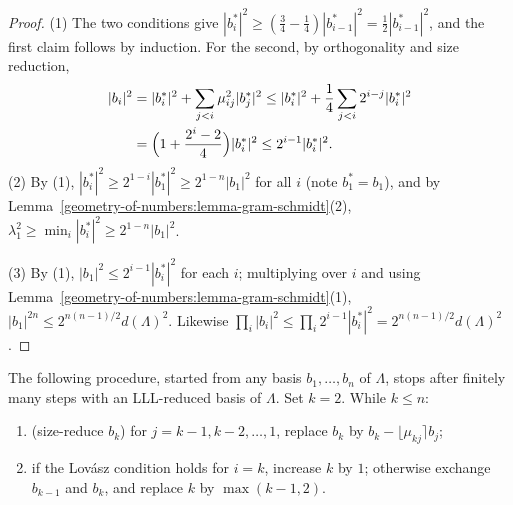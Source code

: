 \begin{proof}
(1) The two conditions give $|b_i^*|^2 \geq (\frac34 - \frac14)|b_{i-1}^*|^2 = \frac12|b_{i-1}^*|^2$, and the first claim follows by induction. For the second, by orthogonality and size reduction,
\[
\begin{aligned}
|b_i|^2 &= |b_i^*|^2 + \sum_{j<i}\mu_{ij}^2|b_j^*|^2 \leq |b_i^*|^2 + \frac14\sum_{j<i}2^{i-j}|b_i^*|^2\\
&= \Bigl(1 + \frac{2^i - 2}{4}\Bigr)|b_i^*|^2 \leq 2^{i-1}|b_i^*|^2.
\end{aligned}
\]
(2) By (1), $|b_i^*|^2 \geq 2^{1-i}|b_1^*|^2 \geq 2^{1-n}|b_1|^2$ for all $i$ (note $b_1^* = b_1$), and by Lemma~\ref{geometry-of-numbers:lemma-gram-schmidt}(2), $\lambda_1^2 \geq \min_i|b_i^*|^2 \geq 2^{1-n}|b_1|^2$.

(3) By (1), $|b_1|^2 \leq 2^{i-1}|b_i^*|^2$ for each $i$; multiplying over $i$ and using Lemma~\ref{geometry-of-numbers:lemma-gram-schmidt}(1), $|b_1|^{2n} \leq 2^{n(n-1)/2}d(\Lambda)^2$. Likewise
$\prod_i|b_i|^2 \leq \prod_i2^{i-1}|b_i^*|^2 = 2^{n(n-1)/2}d(\Lambda)^2$.
\end{proof}

\begin{theorem}\label{geometry-of-numbers:theorem-lll}
The following procedure, started from any basis $b_1, \ldots, b_n$ of $\Lambda$, stops after finitely many steps with an LLL-reduced basis of $\Lambda$. Set $k = 2$. While $k \leq n$:
\begin{enumerate}
\item (size-reduce $b_k$) for $j = k - 1, k - 2, \ldots, 1$, replace $b_k$ by $b_k - \lfloor\mu_{kj}\rceil b_j$;
\item if the Lov\'asz condition holds for $i = k$, increase $k$ by $1$; otherwise exchange $b_{k-1}$ and $b_k$, and replace $k$ by $\max(k - 1, 2)$.
\end{enumerate}
\end{theorem}

